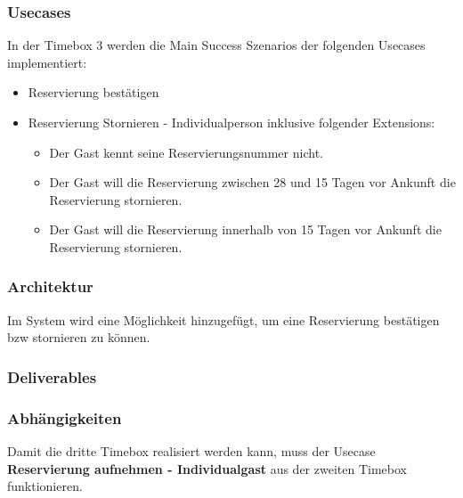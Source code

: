 \subsubsection{Usecases}
In der Timebox 3 werden die Main Success Szenarios der folgenden Usecases implementiert:

\begin{itemize}
	\item Reservierung bestätigen
	\item Reservierung Stornieren - Individualperson inklusive folgender Extensions:
	\begin{itemize}
		\item Der \Gls{Gast} kennt seine \Gls{Reservierungsnummer} nicht.
		\item Der \Gls{Gast} will die Reservierung zwischen 28 und 15 Tagen vor Ankunft die Reservierung stornieren.
		\item Der \Gls{Gast} will die Reservierung innerhalb von 15 Tagen vor Ankunft die Reservierung stornieren.
	\end{itemize}
\end{itemize}
\subsubsection{Architektur}
Im System wird eine Möglichkeit hinzugefügt, um eine \Gls{Reservierung} bestätigen bzw stornieren zu können.
\subsubsection{Deliverables}
\subsubsection{Abhängigkeiten}
Damit die dritte Timebox realisiert werden kann, muss der Usecase \textbf{Reservierung aufnehmen - Individualgast} aus der zweiten Timebox funktionieren.
